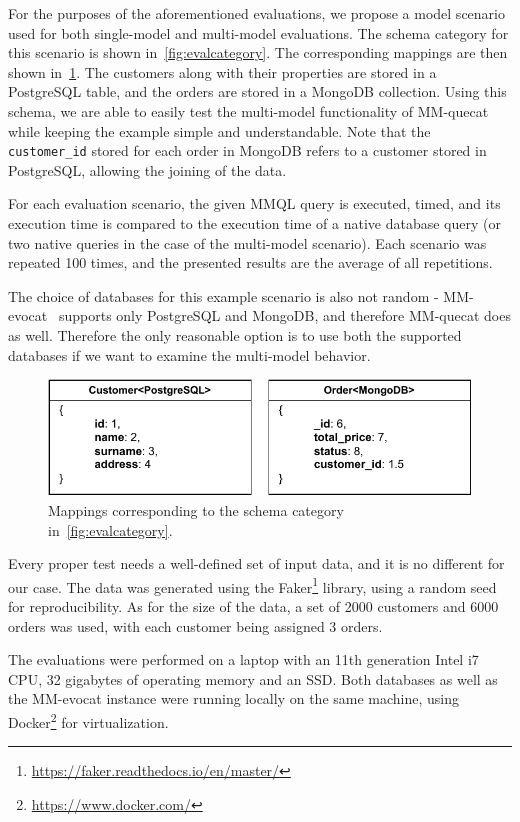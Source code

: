 For the purposes of the aforementioned evaluations, we propose a model scenario used for both single-model and multi-model evaluations.
The schema category for this scenario is shown in~\cref{fig:evalcategory}.
The corresponding mappings are then shown in~\cref{fig:evalmapping}.
The customers along with their properties are stored in a PostgreSQL table, and the orders are stored in a MongoDB collection.
Using this schema, we are able to easily test the multi-model functionality of MM-quecat while keeping the example simple and understandable.
Note that the \texttt{customer\_id} stored for each order in MongoDB refers to a customer stored in PostgreSQL, allowing the joining of the data.

For each evaluation scenario, the given MMQL query is executed, timed, and its execution time is compared to the execution time of a native database query (or two native queries in the case of the multi-model scenario).
Each scenario was repeated 100 times, and the presented results are the average of all repetitions.

The choice of databases for this example scenario is also not random - MM-evocat~\cite{evocat} supports only PostgreSQL and MongoDB, and therefore MM-quecat does as well.
Therefore the only reasonable option is to use both the supported databases if we want to examine the multi-model behavior.

\begin{figure}[h]
\centering
\includegraphics[width=\textwidth]{img/eval-mappings.pdf} 
\caption{Mappings corresponding to the schema category in~\cref{fig:evalcategory}.}
\label{fig:evalmapping}
\end{figure}

Every proper test needs a well-defined set of input data, and it is no different for our case.
The data was generated using the Faker\footnote{\url{https://faker.readthedocs.io/en/master/}} library, using a random seed for reproducibility.
As for the size of the data, a set of 2000 customers and 6000 orders was used, with each customer being assigned 3 orders.

The evaluations were performed on a laptop with an 11th generation Intel i7 CPU, 32 gigabytes of operating memory and an SSD.
Both databases as well as the MM-evocat instance were running locally on the same machine, using Docker\footnote{\url{https://www.docker.com/}} for virtualization.

